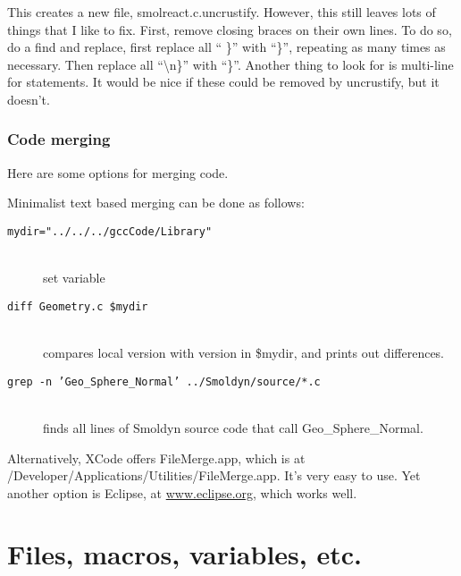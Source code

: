 \documentclass {book}
\begin{document}
This creates a new file, smolreact.c.uncrustify. However, this still leaves lots of things that I like to fix. First, remove closing braces on their own lines. To do so, do a find and replace, first replace all `` \}'' with ``\}'', repeating as many times as necessary. Then replace all ``\textbackslash n\}'' with ``\}''. Another thing to look for is multi-line for statements. It would be nice if these could be removed by uncrustify, but it doesn't.

\subsection{Code merging}

Here are some options for merging code.

Minimalist text based merging can be done as follows:

\begin{description}
\item[\texttt{mydir="../../../gccCode/Library"}]
\hfill \\
set variable
\item[\texttt{diff Geometry.c \$mydir}]
\hfill \\
compares local version with version in \$mydir, and prints out differences.
\item[\texttt{grep -n 'Geo\_Sphere\_Normal' ../Smoldyn/source/*.c}]
\hfill \\
finds all lines of Smoldyn source code that call Geo\_Sphere\_Normal.
\end{description}

Alternatively, XCode offers FileMerge.app, which is at /Developer/Applications/Utilities/FileMerge.app. It's very easy to use. Yet another option is Eclipse, at \url{www.eclipse.org}, which works well.



\chapter{Files, macros, variables, etc.}
\end{document}
